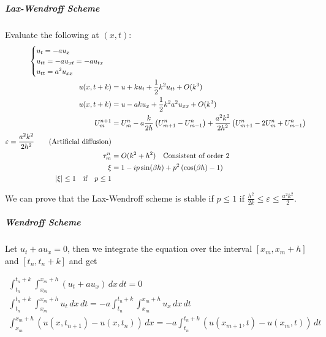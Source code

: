 \subparagraph{Lax-Wendroff Scheme}
Evaluate the following at \((x,t)\):
\begin{align*}
  \begin{cases}
    u_t = -a u_x                   \\
    u_{tt} = -a u_{xt} = -a u_{tx} \\
    u_{tt} = a^2 u_{xx}
  \end{cases}                                                                                                                \\
  u(x, t + k) & = u + k u_t + \frac{1}{2}k^2 u_{tt} + O(k^3)                                                                                    \\
  u(x, t + k) & = u - a k u_x + \frac{1}{2}k^2 a^2 u_{xx} + O(k^3)                                                                              \\
  U_m^{n+1}   & = U_m^n - a \frac{k}{2h}\left( U_{m+1}^n - U_{m-1}^n \right) + \frac{a^2k^2}{2h^2}\left( U_{m+1}^n - 2U_m^n + U_{m-1}^n \right) \\
  \varepsilon = \frac{a^2k^2}{2h^2} \tag{Artificial diffusion}                                                                                  \\
  \tau_m^n    & = O(k^2 + h^2) \quad \text{Consistent of order 2}                                                                               \\
  \xi         & = 1 - ip\sin(\beta h) + p^2\left( \cos(\beta h) - 1 \right)                                                                     \\
  \lvert\xi\rvert \leq 1 \quad \text{if} \quad p \leq 1
\end{align*}

We can prove that the Lax-Wendroff scheme is stable if \(p \leq 1\) if \(\frac{h^2}{2k} \leq \varepsilon \leq \frac{a^2k^2}{2}\).

\subparagraph{Wendroff Scheme}
Let \(u_t + a u_x = 0\), then we integrate the equation over the interval \([x_m, x_m + h]\) and \([t_n, t_n + k]\) and get

\begin{align*}
  \int_{t_n}^{t_n + k} \int_{x_m}^{x_m + h} \left( u_t + a u_x \right) \, dx \, dt = 0                                                         \\
  \int_{t_n}^{t_n + k} \int_{x_m}^{x_m + h} u_t \, dx \, dt = - a \int_{t_n}^{t_n + k} \int_{x_m}^{x_m + h} u_x \, dx \, dt                    \\
  \int_{x_m}^{x_m + h} \left( u(x, t_{n+1}) - u(x, t_n) \right) \, dx = -a \int_{t_n}^{t_n + k} \left( u(x_{m+1}, t) - u(x_m, t) \right) \, dt \\
\end{align*}


